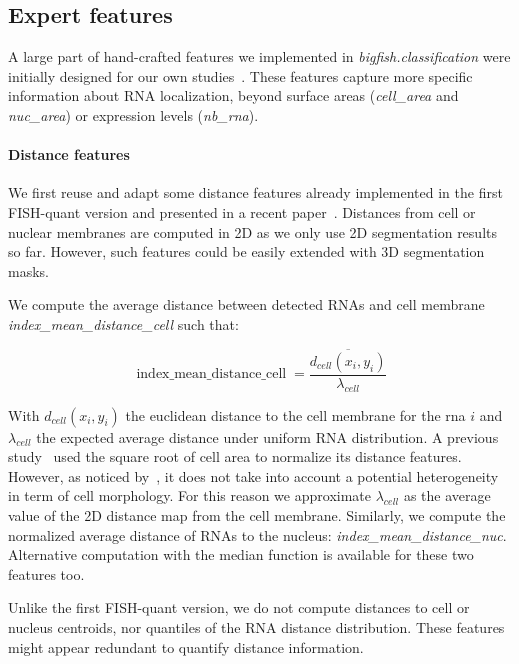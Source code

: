 \subsection{Expert features} \label{subsec:expert_features}

A large part of hand-crafted features we implemented in \emph{bigfish.classification} were initially designed for our own studies~\cite{CHOUAIB_2020,safieddine_choreography_2021,pichon_kinesin_2021}.
These features capture more specific information about \ac{RNA} localization, beyond surface areas (\emph{cell\_area} and \emph{nuc\_area}) or expression levels (\emph{nb\_rna}).

\paragraph{Distance features}

We first reuse and adapt some distance features already implemented in the first FISH-quant version and presented in a recent paper~\cite{samacoits_computational_2018}.
Distances from cell or nuclear membranes are computed in 2D as we only use 2D segmentation results so far.
However, such features could be easily extended with 3D segmentation masks.

We compute the average distance between detected \ac{RNA}s and cell membrane \emph{index\_mean\_distance\_cell} such that:

\begin{equation}
	{\displaystyle \operatorname{index\_mean\_distance\_cell} = \frac{\overline{d_{cell}(x_i, y_i)}}{\lambda_{cell}}}
\end{equation}

\noindent
With $d_{cell}(x_i, y_i)$ the euclidean distance to the cell membrane for the rna $i$ and $\lambda_{cell}$ the expected average distance under uniform \ac{RNA} distribution.
A previous study~\cite{battich_control_2015} used the square root of cell area to normalize its distance features.
However, as noticed by~\cite{samacoits_computational_2018}, it does not take into account a potential heterogeneity in term of cell morphology.
For this reason we approximate $\lambda_{cell}$ as the average value of the 2D distance map from the cell membrane.
Similarly, we compute the normalized average distance of \ac{RNA}s to the nucleus: \emph{index\_mean\_distance\_nuc}.
Alternative computation with the median function is available for these two features too.

Unlike the first FISH-quant version, we do not compute distances to cell or nucleus centroids, nor quantiles of the \ac{RNA} distance distribution.
These features might appear redundant to quantify distance information.

